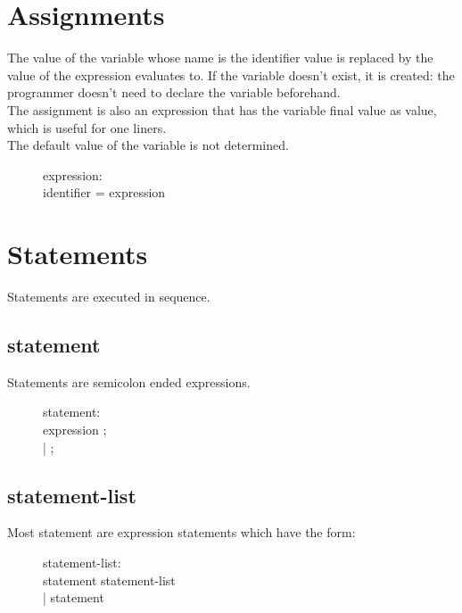 \section{Assignments}
The value of the variable whose name is the identifier value is replaced by the value of the expression
evaluates to. If the variable doesn't exist, it is created: the programmer doesn't need to declare the
variable beforehand.\\
The assignment is also an expression that has the variable final value as value, which is useful for
one liners.\\
The default value of the variable is not determined.
\begin{description}
  \item[]expression: \hfill \\
    identifier = expression
\end{description}

\section{Statements}
Statements are executed in sequence.

\subsection{statement}
Statements are semicolon ended expressions.
\begin{description}
  \item[]statement: \hfill \\
    expression ; \\
    | ;
\end{description}

\subsection{statement-list}
Most statement are expression statements which have the form:
\begin{description}
  \item[]statement-list: \hfill \\
    statement statement-list \\
    | statement
\end{description}

